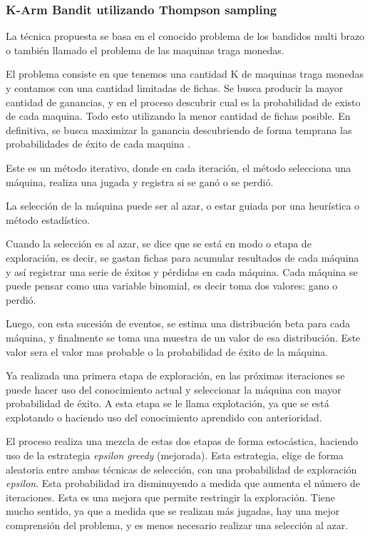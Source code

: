 \documentclass[11pt,a4paper,twoside]{thesis}
\begin{document}
\subsubsection{K-Arm Bandit utilizando Thompson sampling}

La técnica propuesta se basa en el conocido problema de los bandidos multi
brazo o también llamado el problema de las maquinas traga monedas.

El problema consiste en que tenemos una cantidad K de maquinas traga monedas y
contamos con una cantidad limitadas de fichas. Se busca producir la mayor
cantidad de ganancias, y en el proceso descubrir cual es la probabilidad de
existo de cada maquina. Todo esto utilizando la menor cantidad de fichas
posible. En definitiva, se busca maximizar la ganancia descubriendo de forma
temprana las probabilidades de éxito de cada maquina
\cite{intro-reinforcement-learning}.

Este es un método iterativo, donde en cada iteración, el método selecciona una
máquina, realiza una jugada y registra si se ganó o se perdió.

La selección de la máquina puede ser al azar, o estar guiada por una heurística
o método estadístico.

Cuando la selección es al azar, se dice que se está en modo o etapa de
exploración, es decir, se gastan fichas para acumular resultados de cada
máquina y así registrar una serie de éxitos y pérdidas en cada máquina. Cada
máquina se puede pensar como una variable binomial, es decir toma dos valores:
gano o perdió.

Luego, con esta sucesión de eventos, se estima una distribución beta
\cite{thompson-sampling-intuition} para cada máquina, y finalmente se toma una
muestra de un valor de esa distribución. Este valor sera el valor mas probable
o la probabilidad de éxito de la máquina.

Ya realizada una primera etapa de exploración, en las próximas iteraciones se
puede hacer uso del conocimiento actual y seleccionar la máquina con mayor
probabilidad de éxito. A esta etapa se le llama explotación, ya que se está
explotando o haciendo uso del conocimiento aprendido con anterioridad.

El proceso realiza una mezcla de estas dos etapas de forma estocástica,
haciendo uso de la estrategia \textit{epsilon greedy} (mejorada). Esta
estrategia, elige de forma aleatoria entre ambas técnicas de selección, con una
probabilidad de exploración \textit{epsilon}. Esta probabilidad ira
disminuyendo a medida que aumenta el número de iteraciones. Esta es una mejora
que permite restringir la exploración. Tiene mucho sentido, ya que a medida que
se realizan más jugadas, hay una mejor comprensión del problema, y es menos
necesario realizar una selección al azar.
\end{document}
